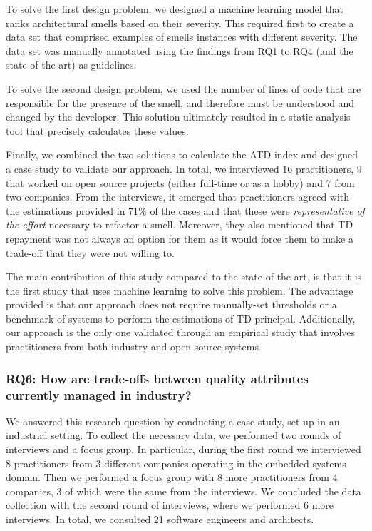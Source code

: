 To solve the first design problem, we designed a machine learning model that ranks architectural smells based on their severity. 
This required first to create a data set that comprised examples of smells instances with different severity. The data set was manually annotated using the findings from RQ1 to RQ4 (and the state of the art) as guidelines. 

To solve the second design problem, we used the number of lines of code that are responsible for the presence of the smell, and therefore must be understood and changed by the developer.
This solution ultimately resulted in a static analysis tool that precisely calculates these values.

Finally, we combined the two solutions to calculate the ATD index and designed a case study to validate our approach.
In total, we interviewed 16 practitioners, 9 that worked on open source projects (either full-time or as a hobby) and 7 from two companies.
From the interviews, it emerged that practitioners agreed with the estimations provided in 71\% of the cases and that these were \emph{representative of the effort} necessary to refactor a smell.
Moreover, they also mentioned that TD repayment was not always an option for them as it would force them to make a trade-off that they were not willing to.

The main contribution of this study compared to the state of the art, is that it is the first study that uses machine learning to solve this problem.
The advantage provided is that our approach does not require manually-set thresholds or a benchmark of systems to perform the estimations of TD principal.
Additionally, our approach is the only one validated through an empirical study that involves practitioners from both industry and open source systems.

\subsubsection*{RQ6: How are trade-offs between quality attributes currently managed in industry?}
We answered this research question by conducting a case study, set up in an industrial setting.
To collect the necessary data, we performed two rounds of interviews and a focus group.
In particular, during the first round we interviewed 8 practitioners from 3 different companies operating in the embedded systems domain.
Then we performed a focus group with 8 more practitioners from 4 companies, 3 of which were the same from the interviews.
We concluded the data collection with the second round of interviews, where we performed 6 more interviews.
In total, we consulted 21 software engineers and architects.

